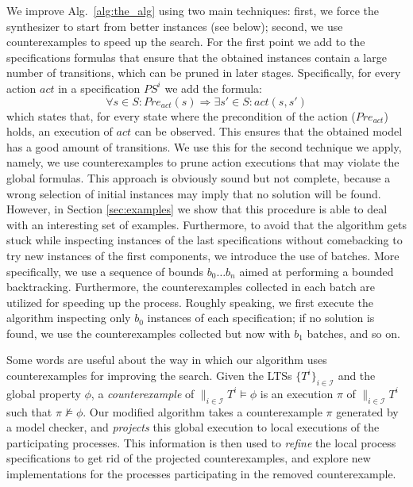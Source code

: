 We improve Alg.~\ref{alg:the_alg} using two main techniques: first, we force the synthesizer to start from better instances (see below); second, we use  counterexamples to speed up the search.
For the first point we add to the specifications formulas that ensure that the obtained instances contain a large number of transitions, which can be pruned in later stages.  Specifically, for every action $\textit{act}$ in a specification $\textit{PS}^i$ we add the formula:
\[
    \forall s \in S : \textit{Pre}_{\textit{act}}(s) \Rightarrow \exists s' \in S : \textit{act}(s,s')
\]
which states that, for every state where the precondition of the action ($\textit{Pre}_{\textit{act}}$) holds,  an execution of $\textit{act}$ can be observed.  This ensures that the obtained model has a good amount of transitions.  We use this for the second technique we apply,  namely, we use counterexamples to prune action executions that may violate the global formulas.  This approach is obviously sound but not complete, because a wrong selection of initial instances may imply that no solution will be found. However, in Section \ref{sec:examples} we show that this procedure is able to deal with an interesting set of examples.  
Furthermore, to avoid that the algorithm gets stuck while inspecting instances of the last specifications without comebacking to try new instances of the first components, we introduce the use of batches.
More specifically,  we use a sequence of bounds $b_0 \dots b_n$
aimed at performing a bounded backtracking. Furthermore,   the counterexamples collected in each batch are utilized for speeding up the process.  Roughly speaking,  we first execute the algorithm inspecting only $b_0$ instances of each specification; if no solution is found,  we use the counterexamples collected  but now with $b_1$ batches,  and so on. 

Some words are useful about the way in which our algorithm uses counterexamples for improving the search. Given the LTSs $\{ T^i \}_{i \in \mathcal{I}}$ and the global {\LTLX} property $\phi$, a \emph{counterexample} of $\parallel_{i \in \mathcal{I}} T^i \models \phi$ is an execution $\pi$ of $\parallel_{i \in \mathcal{I}} T^i$ such that $\pi \nvDash \phi$.  Our modified algorithm takes a counterexample $\pi$ generated by a model checker, and \emph{projects} this global execution to local executions of the participating processes. This information is then used to \emph{refine} the local process specifications to get rid of the projected counterexamples, and explore new implementations for the processes participating in the removed counterexample.

